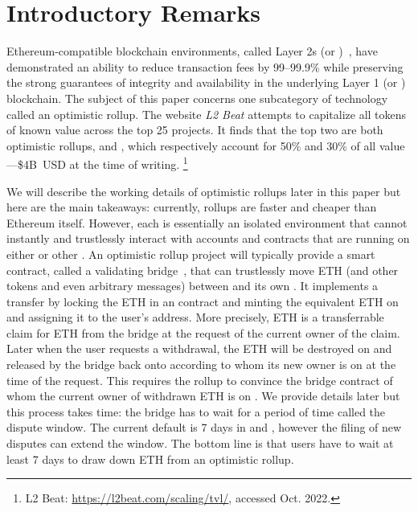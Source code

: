 \section{Introductory Remarks}

Ethereum-compatible blockchain environments, called Layer 2s (or \layertwos)~\cite{gudgeon2019sok}, have demonstrated an ability to reduce transaction fees by 99--99.9\% while preserving the strong guarantees of integrity and availability in the underlying Layer 1 (or \layerone) blockchain. The subject of this paper concerns one subcategory of \layertwo technology called an optimistic rollup. The website \textit{L2 Beat} attempts to capitalize all tokens of known value across the top 25 \layertwo projects. It finds that the top two \layertwos are both optimistic rollups, \arb and \opt, which respectively account for 50\% and 30\% of all \layertwo value---\$4B~USD at the time of writing. \footnote{L2 Beat: \url{https://l2beat.com/scaling/tvl/}, accessed Oct. 2022.}

We will describe the working details of optimistic rollups later in this paper but here are the main takeaways: currently, rollups are faster and cheaper than Ethereum itself. However, each \layertwo is essentially an isolated environment that cannot instantly and trustlessly interact with accounts and contracts that are running on either \layerone or other \layertwos. An optimistic rollup project will typically provide a smart contract, called a validating bridge~\cite{mccorry2021sok}, that can trustlessly move ETH (and other tokens and even arbitrary messages) between \layerone and its own \layertwo. It implements a transfer by locking the ETH in an \layerone contract and minting the equivalent ETH on \layertwo and assigning it to the user's \layertwo address. More precisely, \layertwo ETH is a transferrable claim for \layerone ETH from the \layerone bridge at the request of the current owner of the \layertwo claim. Later when the user requests a withdrawal, the ETH will be destroyed on \layertwo and released by the bridge back onto \layerone according to whom its new owner is on \layertwo at the time of the request. This requires the rollup to convince the \layerone bridge contract of whom the current owner of withdrawn ETH is on \layertwo. We provide details later but this process takes time: the bridge has to wait for a period of time called the dispute window. The current default is 7 days in \arb and \opt, however the filing of new disputes can extend the window. The bottom line is that users have to wait at least 7 days to draw down ETH from an optimistic rollup. 

